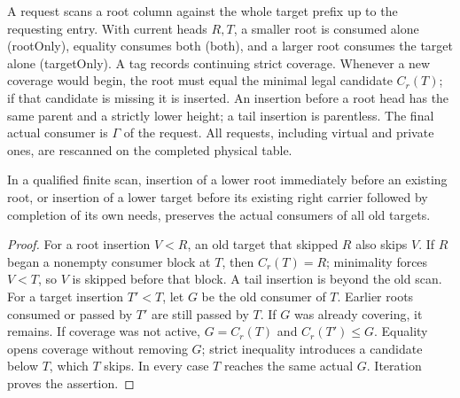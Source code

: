 A request scans a root column against the whole target prefix up to the
requesting entry. With current heads $R,T$, a smaller root is consumed
alone (rootOnly), equality consumes both (both), and a larger root
consumes the target alone (targetOnly). A tag records continuing strict
coverage. Whenever a new coverage would begin, the root must equal the
minimal legal candidate $C_r(T)$; if that candidate is missing it is
inserted. An insertion before a root head has the same parent and a
strictly lower height; a tail insertion is parentless. The final actual
consumer is $\Gamma$ of the request. All requests, including virtual and
private ones, are rescanned on the completed physical table.

\begin{lemma}\label{lem:consumers}
In a qualified finite scan, insertion of a lower root immediately before
an existing root, or insertion of a lower target before its existing
right carrier followed by completion of its own needs, preserves the
actual consumers of all old targets.
\end{lemma}
\begin{proof}
For a root insertion $V<R$, an old target that skipped $R$ also skips
$V$. If $R$ began a nonempty consumer block at $T$, then $C_r(T)=R$;
minimality forces $V<T$, so $V$ is skipped before that block. A tail
insertion is beyond the old scan. For a target insertion $T'<T$, let $G$
be the old consumer of $T$. Earlier roots consumed or passed by $T'$
are still passed by $T$. If $G$ was already covering, it remains. If
coverage was not active, $G=C_r(T)$ and $C_r(T')\le G$. Equality opens
coverage without removing $G$; strict inequality introduces a candidate
below $T$, which $T$ skips. In every case $T$ reaches the same actual
$G$. Iteration proves the assertion. 
\end{proof}

